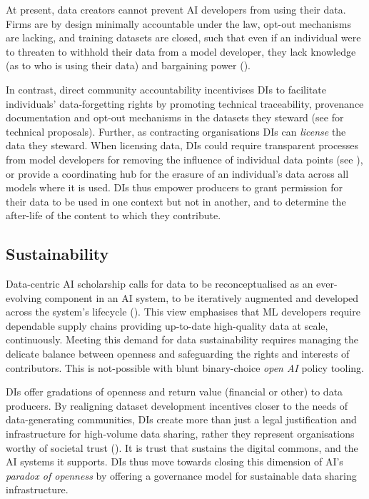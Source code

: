 At present, data creators cannot prevent AI developers from using their data. Firms are by design minimally accountable under the law, opt-out mechanisms are lacking, and training datasets are closed, such that even if an individual were to threaten to withhold their data from a model developer, they lack knowledge (as to who is using their data) and bargaining power (\cite{chan2023ReclaimingDigitalCommons}).

In contrast, direct community accountability incentivises DIs to facilitate individuals’ data-forgetting rights by promoting technical traceability, provenance documentation and opt-out mechanisms in the datasets they steward (see \textcite{chan2023ReclaimingDigitalCommons} for technical proposals). Further, as contracting organisations DIs can \textit{license} the data they steward. When licensing data, DIs could require transparent processes from model developers for removing the influence of individual data points (see \textcite{nguyen2022SurveyMachineUnlearning}), or provide a coordinating hub for the erasure of an individual’s data across all models where it is used. DIs thus empower producers to grant permission for their data to be used in one context but not in another, and to determine the after-life of the content to which they contribute. 

\subsection*{Sustainability}

Data-centric AI scholarship calls for data to be reconceptualised as an ever-evolving component in an AI system, to be iteratively augmented and developed across the system’s lifecycle (\cite{jarrahi2023PrinciplesDataCentricAI}). This view emphasises that ML developers require dependable supply chains providing up-to-date high-quality data at scale, continuously. Meeting this demand for data sustainability requires managing the delicate balance between openness and safeguarding the rights and interests of contributors. This is not-possible with blunt binary-choice \textit{open AI} policy tooling.

DIs offer gradations of openness and return value (financial or other) to data producers. By realigning dataset development incentives closer to the needs of data-generating communities, DIs create more than just a legal justification and infrastructure for high-volume data sharing, rather they represent organisations worthy of societal trust (\cite{mcdonaldReclaimingDataTrusts}). It is trust that sustains the digital commons, and the AI systems it supports. DIs thus move towards closing this dimension of AI's \textit{paradox of openness} by offering a governance model for sustainable data sharing infrastructure.

